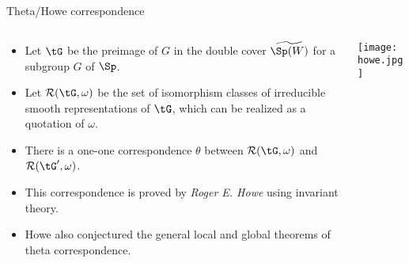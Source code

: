 \documentclass[final,hyperref={pdfpagelabels=false}]{beamer} %
\def\cR{{\mathcal{R}}}
\begin{document}
\begin{frame}
\begin{columns}[t]
\begin{column}{.48\linewidth}
    \begin{block}{Theta/Howe correspondence}
      \begin{columns}
        \begin{column}{0.7\textwidth}
      \begin{itemize}
        \item Let $\tG$ be the preimage of $G$ in the double cover 
          $\widetilde{\Sp(W)}$ for a subgroup $G$ of $\Sp$.
        \item Let $\cR(\tG,\omega)$ be the set of isomorphism classes 
          of irreducible smooth representations of $\tG$,
          which can be realized as a quotation of $\omega$.
        \item There is a one-one correspondence $\theta$
          between $\cR(\tG,\omega)$ and $\cR(\tG',\omega)$.
        \item This correspondence is proved by {\em Roger E. Howe} 
          using invariant theory.
        \item Howe also conjectured the general local and global theorems of theta correspondence.
      \end{itemize}
    \end{column}
    \begin{column}{0.26\textwidth}
      \texttt{[image: howe.jpg]}
    \end{column}
  \end{columns}
\end{block}


\end{column}
\end{columns}
\end{frame}
\end{document}
